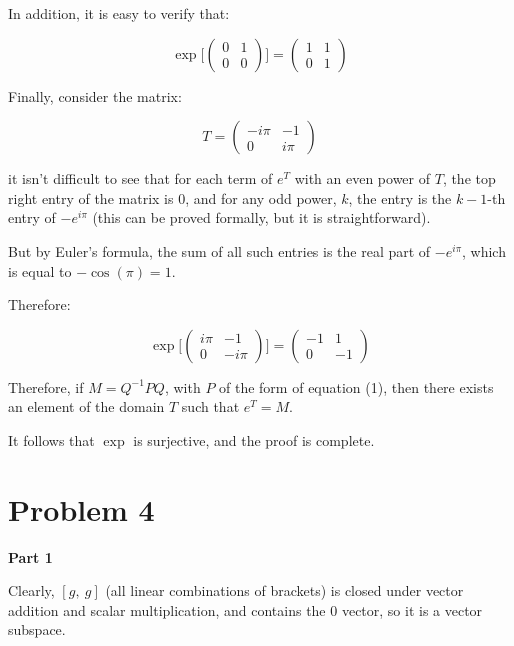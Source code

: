 \documentclass[10pt, oneside]{article}
\begin{document}
    In addition, it is easy to verify that:

    $$\exp \Big[ \begin{pmatrix} 0 & 1 \\ 0 & 0 \end{pmatrix} \Big] = \begin{pmatrix} 1 & 1 \\ 0 & 1 \end{pmatrix} $$

    Finally, consider the matrix:

    $$T = \begin{pmatrix} -i \pi & -1 \\ 0 & i \pi \end{pmatrix}$$

    it isn't difficult to see that for each term of $e^T$ with an even power of $T$, the top right entry of the matrix is $0$, and for any odd power,
    $k$, the entry is the $k - 1$-th entry of $-e^{i\pi}$
    (this can be proved formally, but it is straightforward).
    \newline

    But by Euler's formula, the sum of all such entries is the real part of $-e^{i\pi}$, which is equal to $-\cos(\pi) = 1$.
    \newline

    Therefore:

    $$\exp \Big[ \begin{pmatrix} i\pi & -1 \\ 0 & -i\pi \end{pmatrix} \Big] = \begin{pmatrix} -1 & 1 \\ 0 & -1 \end{pmatrix}$$

    Therefore, if $M = Q^{-1} P Q$, with $P$ of the form of equation (1), then there exists an element of the domain $T$ such that $e^{T} = M$.
    \newline

    It follows that $\exp$ is surjective, and the proof is complete.
    \newline

    \section{Problem 4}

    \textbf{Part 1}
    \newline

    Clearly, $[g, \ g]$ (all linear combinations of brackets) is closed under vector addition and scalar multiplication, and contains the $0$ vector, so it is a vector subspace.
    \newline
\end{document}
